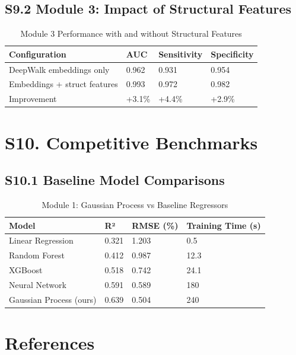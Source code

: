 \documentclass[11pt,a4paper]{article}
\begin{document}
\subsection{S9.2 Module 3: Impact of Structural Features}

\begin{table}[H]
\centering
\caption{Module 3 Performance with and without Structural Features}
\label{tab:ablation_m3}
\begin{tabular}{|l|l|l|l|}
\hline
\textbf{Configuration} & \textbf{AUC} & \textbf{Sensitivity} & \textbf{Specificity} \\
\hline
DeepWalk embeddings only & 0.962 & 0.931 & 0.954 \\
\hline
Embeddings + struct features & 0.993 & 0.972 & 0.982 \\
\hline
Improvement & +3.1\% & +4.4\% & +2.9\% \\
\hline
\end{tabular}
\end{table}

\section{S10. Competitive Benchmarks}

\subsection{S10.1 Baseline Model Comparisons}

\begin{table}[H]
\centering
\caption{Module 1: Gaussian Process vs Baseline Regressors}
\label{tab:baseline_comp}
\small
\begin{tabular}{|l|l|l|l|}
\hline
\textbf{Model} & \textbf{R²} & \textbf{RMSE (\%)} & \textbf{Training Time (s)} \\
\hline
Linear Regression & 0.321 & 1.203 & 0.5 \\
\hline
Random Forest & 0.412 & 0.987 & 12.3 \\
\hline
XGBoost & 0.518 & 0.742 & 24.1 \\
\hline
Neural Network & 0.591 & 0.589 & 180 \\
\hline
Gaussian Process (ours) & 0.639 & 0.504 & 240 \\
\hline
\end{tabular}
\end{table}

\section{References}
\end{document}
